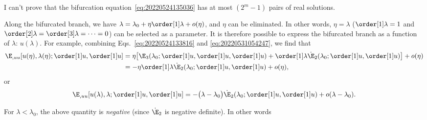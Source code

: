 \begin{remark}
  I can't prove that the bifurcation equation~\eqref{eq:20220524135036} has at most $(2^m - 1)$ pairs of real solutions.
\end{remark}

Along the bifurcated branch, we have $\lambda = \lambda_0 + \eta \order[1]\lambda + o(\eta)$, and $\eta$ can be
eliminated. In other words, $\eta=\lambda$ ($\order[1]\lambda=1$ and $\order[2]\lambda = \order[3]\lambda = \cdots = 0$)
can be selected as a parameter. It is therefore possible to express the bifurcated branch as a function of $\lambda$:
$u(\lambda)$. For example, combining Eqs.~\eqref{eq:20220524133816} and \eqref{eq:20220531054247}, we find that
\begin{equation}
  \begin{aligned}[b]
    \E_{, uu}[u(\eta), \lambda(\eta); \order[1]u, \order[1]u]
    &= \eta \bigl[\E_3(\lambda_0 ; \order[1]u, \order[1]u, \order[1]u)  + \order[1]\lambda \dot{\E}_2(\lambda_0; \order[1]u, \order[1]u)\bigr] + o(\eta)\\
    &= - \eta \order[1]\lambda \dot{\E}_2(\lambda_0; \order[1]u, \order[1]u) + o(\eta),
  \end{aligned}
\end{equation}
or
\begin{equation}
  \label{eq:20220819160235}
  \E_{, uu}[u(\lambda), \lambda; \order[1]u, \order[1]u] = -\bigl( \lambda - \lambda_0 \bigr) \dot{\E}_2(\lambda_0; \order[1]u, \order[1]u) + o(\lambda - \lambda_0).
\end{equation}

For $\lambda < \lambda_0$, the above quantity is \emph{negative} (since $\dot{\E}_2$ is negative definite). In other
words

\begin{center}
\end{center}

